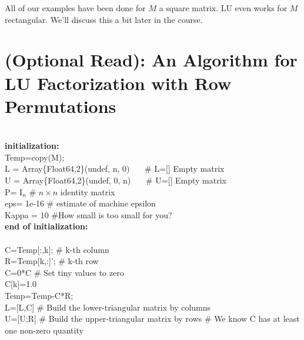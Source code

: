  \begin{tcolorbox}[sharp corners, colback=green!30, colframe=green!80!blue, title=\textbf{\Large How General Can LU Go?}]
  All of our examples have been done for $M$ a square matrix. LU even works for $M$ rectangular. We'll discuss this a bit later in the course.
 \end{tcolorbox}
 \newpage
 
 \section{(Optional Read): An Algorithm for LU Factorization with Row Permutations}
 
 \begin{tcolorbox}[sharp corners, colback=green!30, colframe=green!80!blue, title=\textbf{\Large LU Factorization of Square Matrices}]
 \begin{algorithm}[H]
\SetAlgoLined
{}
\mbox{} \\
 \textbf{initialization:}\\
 {\rm Temp}=copy(M); \\
L = Array\{Float64,2\}(undef, n, 0)  ~~~\# L=[] Empty matrix\\
U = Array\{Float64,2\}(undef, 0, n)  ~~~\# U=[] Empty matrix\\
 P= I$_n$ \# $n \times n$ identity matrix\\
 eps= 1e-16 \# estimate of machine epsilon \\
 Kappa = 10  \#How small is too small for you?\\
  \textbf{end of initialization:}\\
\mbox{}  \\
 {
    C=Temp[:,k]; \# k-th column\\
    R={\rm Temp}[k,:]'; \# k-th row\\
  { 
      C=0*C \# Set tiny values to zero\\
      C[k]=1.0 \\
    {\rm Temp}={\rm Temp}-C*R; \\
     L=[L,C]  \# Build the lower-triangular matrix by columns\\
    U=[U;R] \# Build the upper-triangular matrix by rows
   }
   {
   \# We know C has at least one non-zero quantity \\ 
}}
\end{algorithm}
\end{tcolorbox}
